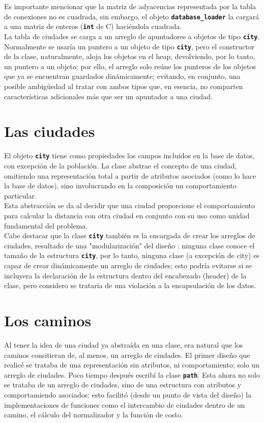 \documentclass[a4paper]{report}
\begin{document}
Es importante mencionar que la matriz de adyacencias representada por la tabla de
conexiones no es cuadrada, sin embargo, el objeto \textbf{\texttt{database\_loader}}
la cargar\'a  a una matriz de enteros (\textbf{\texttt{int}} de C) haci\'endola cuadrada.\\

La tabla de ciudades se carga a un arreglo de apuntadores a objetos de tipo
\textbf{\texttt{city}}. Normalmente se usar\'ia un puntero a un objeto de tipo
\textbf{\texttt{city}}, pero el constructor de la clase, naturalmente, aloja los
objetos en el heap, devolviendo, por lo tanto, un puntero a un objeto;
por ello, el arreglo solo re\'une los punteros de los objetos que
ya se encuentran guardados din\'amicamente; evitando, en conjunto,
una posible ambig\"uedad al tratar con ambos tipos que, en esencia, no
comparten caracter\'isticas adicionales m\'as que ser un apuntador a una ciudad.

\section{Las ciudades}
El objeto \textbf{\texttt{city}} tiene como propiedades los campos incluidos en la base de
datos, con excepci\'on de la poblaci\'on. La clase abstrae el concepto de una
ciudad, omitiendo una representaci\'on total a partir de atributos asociados
(como lo hace la base de datos), sino involucrando en la composici\'on un
comportamiento particular.\\

Esta abstracci\'on se da al decidir que una ciudad proporcione el comportamiento
para calcular la distancia con otra ciudad en conjunto con su uso como unidad
fundamental del problema.\\

Cabe destacar que la clase \textbf{\texttt{city}} tambi\'en es la encargada de crear los
arreglos de ciudades, resultado de una "modularizaci\'on" del dise\~no : ninguna clase
conoce el tama\~no de la estructura \textbf{\texttt{city}}, por lo tanto, ninguna clase (a
excepci\'on de city) es capaz de crear din\'amicamente un arreglo de ciudades; esto
podr\'ia evitarse si se incluyera la declaraci\'on de la estructura dentro del encabezado
(header) de la clase, pero considero se tratar\'ia de una violaci\'on a la encapsulaci\'on
de los datos.

\section{Los caminos}
Al tener la idea de una ciudad ya abstra\'ida en una clase, era natural que los caminos consitieran
de, al menos, un arreglo de ciudades. El primer dise\~no que realic\'e se trataba de una representaci\'on
sin atributos, ni comportamiento; solo un arreglo de ciudades. Poco tiempo despu\'es escrib\'i la
clase \textbf{\texttt{path}}. Esta ahora no solo se trataba de un arreglo de ciudades, sino de
una estructura con atributos y comportamiendo asociados: esto facilit\'o (desde un punto de vista
del dise\~no) la implementaciones de funciones como el intercambio de ciudades dentro de un camino,
el c\'alculo del normalizador y la funci\'on de costo.\\
\end{document}
